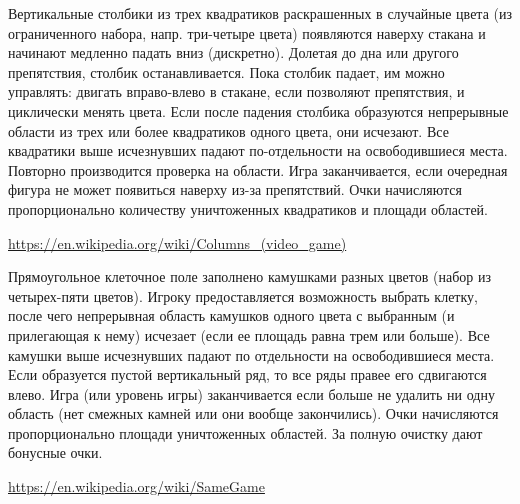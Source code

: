 
\begin{zztask}[Columns, 1989]
Вертикальные столбики из трех квадратиков раскрашенных в случайные цвета (из
ограниченного набора, напр. три-четыре цвета) появляются наверху стакана и
начинают медленно падать вниз (дискретно). Долетая до дна или другого
препятствия, столбик останавливается. Пока столбик падает, им можно управлять:
двигать вправо-влево в стакане, если позволяют препятствия, и циклически
менять цвета. Если после падения столбика образуются непрерывные области из
трех или более квадратиков одного цвета, они исчезают. Все квадратики выше
исчезнувших падают по-отдельности на освободившиеся места. Повторно
производится проверка на области. Игра заканчивается, если очередная фигура не
может появиться наверху из-за препятствий. Очки начисляются пропорционально
количеству уничтоженных квадратиков и площади областей.
\begin{flushright}
	\url{https://en.wikipedia.org/wiki/Columns_(video_game)}
\end{flushright}
\end{zztask}


\begin{zztask}[SameGame, 1985]
Прямоугольное клеточное поле заполнено камушками разных цветов (набор из
четырех-пяти цветов). Игроку предоставляется возможность выбрать клетку, после
чего непрерывная область камушков одного цвета с выбранным (и прилегающая к
нему) исчезает (если ее площадь равна трем или больше). Все камушки выше
исчезнувших падают по отдельности на освободившиеся места. Если образуется
пустой вертикальный ряд, то все ряды правее его сдвигаются влево. Игра (или
уровень игры) заканчивается если больше не удалить ни одну область (нет
смежных камней или они вообще закончились). Очки начисляются пропорционально
площади уничтоженных областей. За полную очистку дают бонусные очки.
\begin{flushright}
	\url{https://en.wikipedia.org/wiki/SameGame}
\end{flushright}
\end{zztask}


